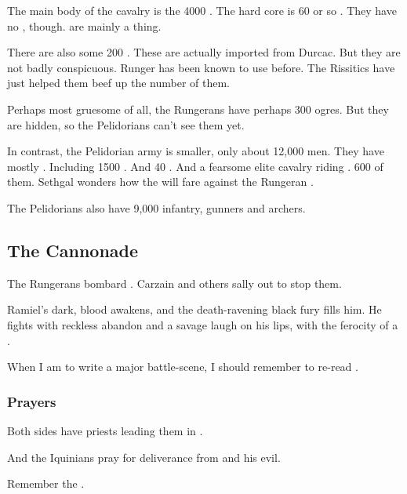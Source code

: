 The main body of the cavalry is the 4000 \relcers. 
The hard core is 60 or so \murocs. 
They have no \grulcans, though. 
\Grulcans are mainly a \Galessan thing.

There are also some 200 \mezolisks. 
These are actually imported from Durcac. 
But they are not badly conspicuous. 
Runger has been known to use \mezolisks{} before. 
The Rissitics have just helped them beef up the number of them. 

Perhaps most gruesome of all, the Rungerans have perhaps 300 \nephil ogres. 
But they are hidden, so the Pelidorians can't see them yet. 

In contrast, the Pelidorian army is smaller, only about 12,000 men. 
They have mostly \scathae. 
Including 1500 \relcers.
And 40 \murocs. 
And a fearsome elite cavalry riding \grulcans.
600 of them. 
Sethgal wonders how the \grulcans will fare against the Rungeran \mezolisks. 

The Pelidorians also have 9,000 infantry, gunners and archers. 







\subsection{The Cannonade}
The Rungerans bombard \Forclin.
Carzain and others sally out to stop them. 

Ramiel's dark, \draconic{} blood awakens, and the death-ravening black fury fills him. 
He fights with reckless abandon and a savage laugh on his lips, with the ferocity of a \dragon{}. 

When I am to write a major battle-scene, I should remember to re-read . 





\subsubsection{Prayers}
Both sides have priests leading them in . 

And the Iquinians pray for deliverance from  and his evil.

Remember the . 





